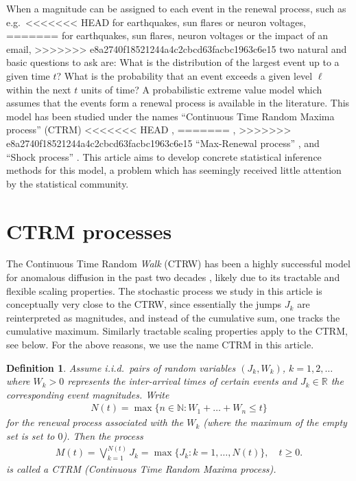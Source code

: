 \documentclass[12pt]{article}
\newtheorem{definition}[theorem]{Definition}
\theoremstyle{definition}
\theoremstyle{remark}
\numberwithin{equation}{section}
\newcommand{\R}{\mathbb R}
\newcommand{\1}{\mathbf 1}
\begin{document}
When a magnitude can be assigned to each event in the renewal process, 
such as e.g.\
<<<<<<< HEAD
for earthquakes, sun flares or neuron voltages,
=======
for earthquakes, sun flares, neuron voltages or the impact of an email,
>>>>>>> e8a2740f18521244a4c2cbcd63facbc1963c6e15
two natural and basic questions to ask are: 
What is the distribution of the largest event up to a given time $t$?
What is the probability that an event exceeds a given level $\ell$ within the
next $t$ units of time?
A probabilistic extreme value model which assumes that the events form a 
renewal process is available in the literature. 
This model has been studied under the names
``Continuous Time Random Maxima process'' (CTRM) 
<<<<<<< HEAD
\cite{Benson2007,MeerschaertStoev08,Hees16,Hees14}, 
=======
\cite{Benson2007,Meerschaert2009,Hees16,Hees2015}, 
>>>>>>> e8a2740f18521244a4c2cbcd63facbc1963c6e15
``Max-Renewal process'' \cite{Silvestrov2002a,ST04,Basrak2014}, 
and ``Shock process'' 
\cite{Esary1973,Sumita1983,Sumita1984,Sumita1985,Anderson1987,Gut1999}.
This article aims to develop concrete statistical inference methods for this model, 
a problem which has seemingly received little attention by the statistical 
community. 

\section{CTRM processes}

The Continuous Time Random \emph{Walk} (CTRW) has been a highly successful 
model for anomalous diffusion in the past two decades 
\cite{Metzler2000,HLS2010b}, likely due to its tractable and flexible scaling
properties.
The stochastic process we study in this article is conceptually very close
to the CTRW, since essentially the jumps $J_k$ are reinterpreted as 
magnitudes, and instead of the cumulative sum, one tracks the cumulative 
maximum. Similarly tractable scaling properties apply to the CTRM, see below.
For the above reasons, we use the name CTRM in this article.


\begin{definition}
Assume i.i.d.\ pairs of random variables $(J_k, W_k)$, $k = 1, 2, \ldots$
where $W_k > 0$ represents the inter-arrival times of certain events and 
$J_k \in \R$ the corresponding event magnitudes.  
Write 
\begin{align} \label{eq:renewal-process}
N(t) = \max\{n \in \mathbb N: W_1 + \ldots + W_n \le t\}
\end{align}
for the renewal process
associated with the $W_k$ (where the maximum of the empty set is set to $0$).
Then the process
\begin{align}
M(t) = \bigvee_{k=1}^{N(t)} J_k
= \max\{J_k: k = 1, \ldots, N(t)\}, \quad t \ge 0.
\end{align}
is called a CTRM (Continuous Time Random Maxima process).
\end{definition}
\end{document}
